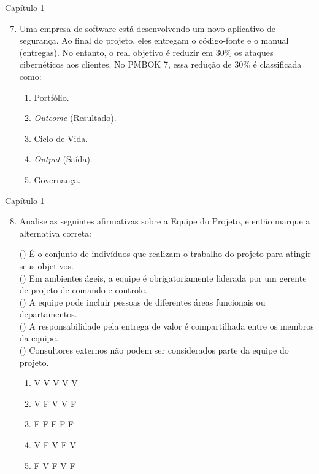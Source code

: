 \documentclass{beamer}
\begin{document}
\begin{frame}{Capítulo 1}
	\begin{enumerate}
		\setcounter{enumi}{6}
		\justifying
		\item Uma empresa de software está desenvolvendo um novo aplicativo de segurança. Ao final do projeto, eles entregam o código-fonte e o manual (entregas). No entanto, o real objetivo é reduzir em 30\% os ataques cibernéticos aos clientes. No PMBOK 7, essa redução de 30\% é classificada como:
		\begin{enumerate}[a]
			\justifying
			\item Portfólio.
			\item \alert<2>{\textit{Outcome} (Resultado)}.
			\item Ciclo de Vida.
			\item \textit{Output} (Saída).
			\item Governança.
		\end{enumerate}
	\end{enumerate}
\end{frame}

\begin{frame}{Capítulo 1}
	\begin{enumerate}
		\setcounter{enumi}{7}
		\justifying
		\item Analise as seguintes afirmativas sobre a Equipe do Projeto, e então marque a alternativa correta:
		
		\vspace{10pt} \footnotesize
		(\hspace{10pt}) É o conjunto de indivíduos que realizam o trabalho do projeto para atingir seus objetivos.\\
		(\hspace{10pt}) Em ambientes ágeis, a equipe é obrigatoriamente liderada por um gerente de projeto de comando e controle.\\
		(\hspace{10pt}) A equipe pode incluir pessoas de diferentes áreas funcionais ou departamentos.\\
		(\hspace{10pt}) A responsabilidade pela entrega de valor é compartilhada entre os membros da equipe.\\
		(\hspace{10pt}) Consultores externos não podem ser considerados parte da equipe do projeto.
		
		\vspace{10pt} \normalsize
		\begin{enumerate}[a]
			\justifying
			\item V V V V V
			\item \alert<2>{V F V V F}
			\item F F F F F
			\item V F V F V
			\item F V F V F
		\end{enumerate}
	\end{enumerate}
\end{frame}
\end{document}
